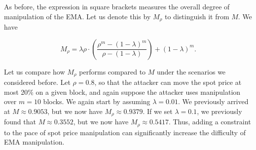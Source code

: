 \documentclass[bibliography=numbered]{article}
\begin{document}
As before, the expression in square brackets measures the overall degree of manipulation of the EMA. Let us denote this by $M_{\rho}$ to distinguish it from $M$. We have

\begin{equation}
\label{eq:EMA-manipulation-rho}
    M_{\rho}
    =
    \lambda \rho \cdot \left( \frac{\rho^{m} - (1 - \lambda)^{m}}{\rho - \left( 1 - \lambda \right)} \right) + (1 - \lambda)^m.
\end{equation}

Let us compare how $M_{\rho}$ performs compared to $M$ under the scenarios we considered before. Let $\rho = 0.8$, so that the attacker can move the spot price at most 20\% on a given block, and again suppose the attacker uses manipulation over $m = 10$ blocks. We again start by assuming $\lambda = 0.01$. We previously arrived at $M \approx 0.9053$, but we now have $M_\rho \approx 0.9379$. If we set $\lambda = 0.1$, we previously found that $M \approx 0.3552$, but we now have $M_\rho \approx 0.5417$. Thus, adding a constraint to the pace of spot price manipulation can significantly increase the difficulty of EMA manipulation.
\end{document}
